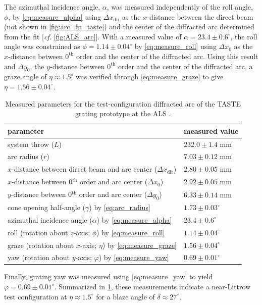 The azimuthal incidence angle, $\alpha$, was measured independently of the roll angle, $\phi$, by \cref{eq:measure_alpha} using $\Delta x_{\text{dir}}$ as the $x$-distance between the direct beam (not shown in \cref{fig:arc_fit_taste}) and the center of the diffracted arc determined from the fit [\emph{cf.\@} \cref{fig:ALS_arc}]. 
With a measured value of $\alpha = 23.4 \pm 0.6^{\circ}$, the roll angle was constrained as $\phi = 1.14 \pm 0.04^{\circ}$ by \cref{eq:measure_roll} using $\Delta x_0$ as the $x$-distance between $0^{\text{th}}$ order and the center of the diffracted arc. 
Using this result and $\Delta y_0$, the $y$-distance between $0^{\text{th}}$ order and the center of the diffracted arc, a graze angle of $\eta \approx 1.5^{\circ}$ was verified through \cref{eq:measure_graze} to give $\eta = 1.56 \pm 0.04^{\circ}$. 
\begin{table}[]
\centering
\caption[Measured parameters for the test-configuration diffracted arc of the TASTE grating prototype at the ALS]{Measured parameters for the test-configuration diffracted arc of the TASTE grating prototype at the ALS \cite{McCoy20}.}\label{tab:arc_params_taste}
\begin{tabular}{@{}ll@{}}
\toprule
parameter                                                                 & measured value             \\ \midrule
system throw ($L$)                                                        & $232.0 \pm 1.4$ mm     \\
arc radius ($r$)                                                          & $7.03 \pm 0.12$ mm       \\
$x$-distance between direct beam and arc center ($\Delta x_{\text{dir}}$) & $2.80 \pm 0.05$ mm       \\
$x$-distance between 0$^{\text{th}}$ order and arc center ($\Delta x_0$)  & $2.92 \pm 0.05$ mm       \\
$y$-distance between 0$^{\text{th}}$ order and arc center ($\Delta y_0$)  & $6.33 \pm 0.14$ mm       \\ \midrule
cone opening half-angle ($\gamma$) by \cref{eq:arc_radius}        	& $1.73 \pm 0.03^{\circ}$  \\
azimuthal incidence angle ($\alpha$) by \cref{eq:measure_alpha}       & $23.4 \pm 0.6^{\circ}$ \\ \midrule
roll (rotation about $z$-axis; $\phi$) by \cref{eq:measure_roll}      & $1.14 \pm 0.04^{\circ}$  \\
graze (rotation about $x$-axis; $\eta$) by \cref{eq:measure_graze}      & $1.56 \pm 0.04^{\circ}$  \\
yaw (rotation about $y$-axis; $\varphi$) by \cref{eq:measure_yaw}     & $0.69 \pm 0.01^{\circ}$  \\ \bottomrule
\end{tabular}
\end{table}
Finally, grating yaw was measured using \cref{eq:measure_yaw} to yield $\varphi = 0.69 \pm 0.01^{\circ}$. 
Summarized in \cref{tab:arc_params_taste}, these measurements indicate a near-Littrow test configuration at $\eta \approx 1.5^{\circ}$ for a blaze angle of $\delta \approx 27^{\circ}$. 

